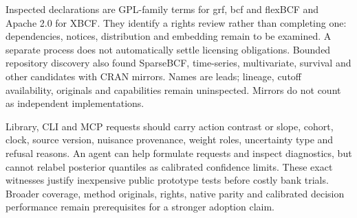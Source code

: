 Inspected declarations are GPL-family terms for grf, bcf and flexBCF and Apache 2.0 for XBCF. They identify a rights review rather than completing one: dependencies, notices, distribution and embedding remain to be examined. A separate process does not automatically settle licensing obligations. Bounded repository discovery also found SparseBCF, time-series, multivariate, survival and other candidates with CRAN mirrors. Names are leads; lineage, cutoff availability, originals and capabilities remain uninspected. Mirrors do not count as independent implementations.\citep{exec21_cxx_grf,exec21_cxx_bcf,exec21_cxx_xbcf,exec21_cxx_flexbcf}

Library, CLI and MCP requests should carry action contrast or slope, cohort, clock, source version, nuisance provenance, weight roles, uncertainty type and refusal reasons. An agent can help formulate requests and inspect diagnostics, but cannot relabel posterior quantiles as calibrated confidence limits. These exact witnesses justify inexpensive public prototype tests before costly bank trials. Broader coverage, method originals, rights, native parity and calibrated decision performance remain prerequisites for a stronger adoption claim.
